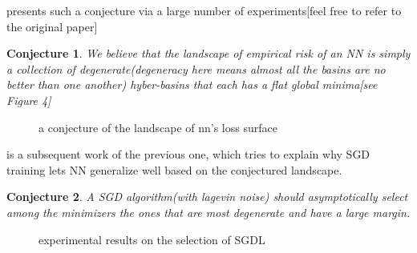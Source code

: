 \documentclass[10pt,a4paper]{article}
\newtheorem{vp}{Conjecture}
\begin{document}
\cite{Poggio2017} presents such a conjecture via a large number of experiments[feel free to refer to the original paper]
\begin{vp}
	We believe that the landscape of empirical risk of an NN is simply a collection of degenerate(degeneracy here means almost all the basins are no better than one another) hyber-basins that each has a flat global minima[see Figure 4]
\end{vp}
\begin{figure}[htb]
       \caption{\label{fig:d-label} a conjecture of the landscape of nn's loss surface}
\end{figure}

\cite{Zhang2017} is a subsequent work of the previous one, which tries to explain why SGD training lets NN generalize well based on the conjectured landscape.

\begin{vp}
	A SGD algorithm(with \textit{lagevin noise}) should asymptotically select among the minimizers the ones that are most degenerate and have a large margin.
\end{vp}
\begin{figure}[htb]
       \caption{\label{fig:e-label} experimental results on the selection of SGDL}
\end{figure}
\end{document}
